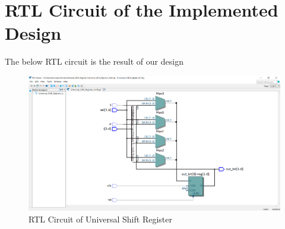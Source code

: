 \documentclass[12pt]{article}
\begin{document}
\section{RTL Circuit of the Implemented Design}
The below RTL circuit is the result of our design
\begin{figure}[H]
    \centering
    \includegraphics[width=14cm,keepaspectratio]{usr6.png}
    \caption{RTL Circuit of Universal Shift Register}
\end{figure}

\newpage
\end{document}
